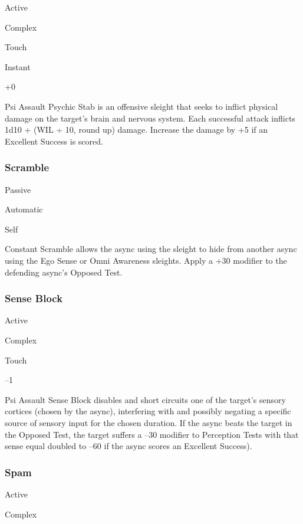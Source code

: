   

Active

   Complex

 Touch

   Instant

   +0

  

Psi Assault
Psychic Stab is an offensive sleight that seeks to inflict 
physical damage on the target's brain and nervous 
system. Each successful attack inflicts 1d10 + (WIL ÷ 
10, round up) damage. Increase the damage by +5 if 
an Excellent Success is scored.

\subsubsection{Scramble}


  

Passive

   Automatic

 Self

   Constant
Scramble allows the async using the sleight to hide 
from another async using the Ego Sense or Omni 
Awareness sleights. Apply a +30 modifier to the defending
async's Opposed Test.

\subsubsection{Sense Block}


  

Active

   Complex

 Touch

  

   –1

  

Psi Assault
Sense Block disables and short circuits one of the target's
sensory cortices (chosen by the async), interfering
with and possibly negating a specific source of sensory 
input for the chosen duration. If the async beats the 
target in the Opposed Test, the target suffers a –30 
modifier to Perception Tests with that sense equal doubled
to –60 if the async scores an Excellent Success).

\subsubsection{Spam}


  

Active

   Complex

